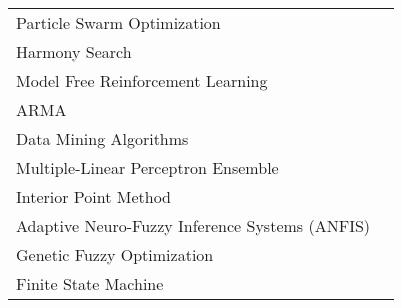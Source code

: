 \begin{table}[ht]
\begin{tabular}{L{8cm} p{5cm}}
Particle Swarm Optimization   & \cite{HeXiaofei2014}\cite{Kusiak2010ReheatBox}\cite{Kusiak2010ModelingAndOptimization}\cite{Kusiak2012ModelingAndOptimizationOfHVAC}\cite{Kusiak2011OptimizationOfAnHVACSystemWithAStrength}\cite{WeiXiupeng2015}\cite{WeiXiupeng2014ModelingAndOptimizationOfAChillerPlant}\\

Harmony Search    &  \cite{HeXiaofei2014}   \\ 

Model Free Reinforcement Learning & \cite{Henze2003EvaluationSystems}\cite{Liu2006ExperimentalFoundation} \\

ARMA   &  \cite{Jin2005Prediction-basedSystems}  \\

Data Mining Algorithms & \cite{Kusiak2011MultiObjective}\cite{Kusiak2010}\cite{Kusiak2010ReheatBox}\cite{Kusiak2010ModelingAndOptimization} \\ 

Multiple-Linear Perceptron Ensemble & \cite{Kusiak2014MinimizationOfEnergyConsumptionInHVAC}\cite{Kusiak2010ModelingAndOptimization}\cite{WeiXiupeng2015}\cite{Kusiak2013MinimizingEnergyConsumption} \\ 

Interior Point Method & \cite{Kusiak2014MinimizationOfEnergyConsumptionInHVAC} \\

Adaptive Neuro-Fuzzy Inference Systems (ANFIS) & \cite{LuLu2005HVACSystemOptimization}  \\

Genetic Fuzzy Optimization &  \cite{Parameshwaran2010EnergyAlgorithm}  \\ 

Finite State Machine &  \cite{Seem1999} \\ 

\bottomrule
\end{tabular}
\end{table}
